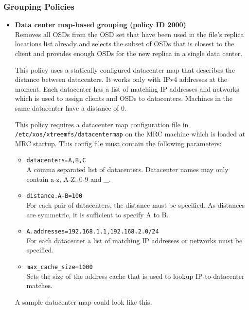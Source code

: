 \documentclass[a4paper,10pt]{book}
\begin{document}
\subsubsection{Grouping Policies}

\begin{itemize}

 \item \textbf{Data center map-based grouping (policy ID 2000)}\\
 Removes all OSDs from the OSD set that have been used in the file's replica locations list already and selects the subset of OSDs that is closest to the client and provides enough OSDs for the new replica in a single data center.

 This policy uses a statically configured datacenter map that describes the distance between datacenters. It works only with IPv4 addresses at the moment. Each datacenter has a list of matching IP addresses and networks which is used to assign clients and OSDs to datacenters. Machines in the same datacenter have a distance of 0.

	This policy requires a datacenter map configuration file in\\
	\texttt{/etc/xos/xtreemfs/datacentermap} on the MRC machine which is loaded at MRC startup. This config file must contain the following parameters:
	\begin{itemize}
		\item \texttt{datacenters=A,B,C}\\
			A comma separated list of datacenters. Datacenter names may only contain a-z, A-Z, 0-9 and \_.

		\item \texttt{distance.A-B=100}\\
			For each pair of datacenters, the distance must be specified. As distances are symmetric, it is sufficient to specify A to B.

		\item \texttt{A.addresses=192.168.1.1,192.168.2.0/24}\\
			For each datacenter a list of matching IP addresses or networks must be specified.

		\item \texttt{max\_cache\_size=1000}\\
			Sets the size of the address cache that is used to lookup IP-to-datacenter matches.
	\end{itemize}

	A sample datacenter map could look like this:


\end{itemize}
\end{document}
